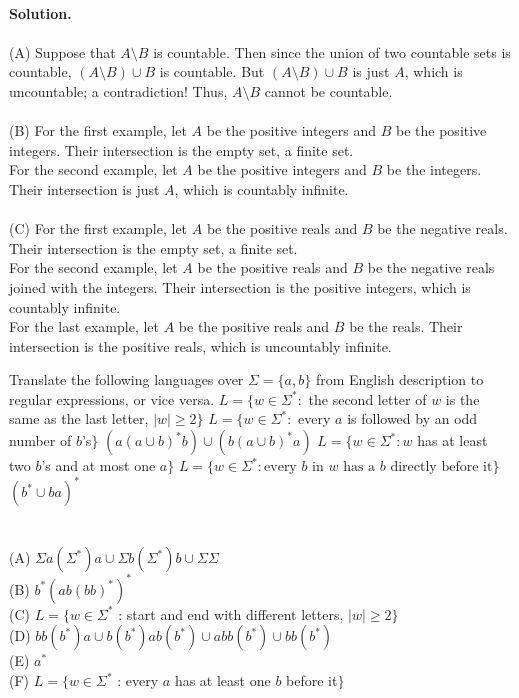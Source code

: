 \documentclass[solution, letterpaper]{cs121}
\begin{document}
\pagebreak
\noindent\\ {\bf Solution.}
\noindent\\\\ (A) Suppose that $A \setminus B$ is countable.  Then since the union of two countable sets is countable, $(A \setminus B) \cup B$ is countable.  But $(A \setminus B) \cup B$ is just $A$, which is uncountable; a contradiction!  Thus, $A \setminus B$ cannot be countable.
\noindent\\\\ (B) For the first example, let $A$ be the positive integers and $B$ be the positive integers.  Their intersection is the empty set, a finite set.  \\\indent For the second example, let $A$ be the positive integers and $B$ be the integers.  Their intersection is just $A$, which is countably infinite.
\noindent\\\\ (C) For the first example, let $A$ be the positive reals and $B$ be the negative reals.  Their intersection is the empty set, a finite set.  \\\indent For the second example, let $A$ be the positive reals and $B$ be the negative reals joined with the integers.  Their intersection is the positive integers, which is countably infinite.  \\\indent For the last example, let $A$ be the positive reals and $B$ be the reals.  Their intersection is the positive reals, which is uncountably infinite.
	
Translate the following languages over $\Sigma=\{a,b\}$ from English description to regular expressions, or vice versa.
\subproblem $L = \{w\in\Sigma^*:$ the second letter of $w$ is the same as the last letter, $|w| \geq 2 \}$
\subproblem $L = \{w\in\Sigma^*:$ every $a$ is followed by an odd number of $b$'s$\}$
\subproblem $(a(a\cup b)^*b) \cup (b(a\cup b)^*a)$
\subproblem $L = \{w\in\Sigma^*:w$ has at least two $b$'s and at most one $a\}$
\subproblem $L = \{ w \in \Sigma^* :  \text{every }b\text{ in }w\text{ has a }b\text{ directly before it} \}$ 
\subproblem $(b^* \cup ba)^*$ \\
	
\noindent\\\\(A) $\Sigma a(\Sigma^*)a \cup \Sigma b(\Sigma^*)b \cup \Sigma\Sigma$
\noindent\\(B) $b^*(ab(bb)^*)^*$
\noindent\\(C) $L = \{w \in \Sigma^*$ : start and end with different letters, $|w| \ge 2\}$
\noindent\\(D) $bb(b^*)a \cup b(b^*)ab(b^*) \cup abb(b^*) \cup bb(b^*)$
\noindent\\(E) $a^*$
\noindent\\(F) $L = \{w \in \Sigma^*$ : every $a$ has at least one $b$ before it$\}$
	
\end{document}
